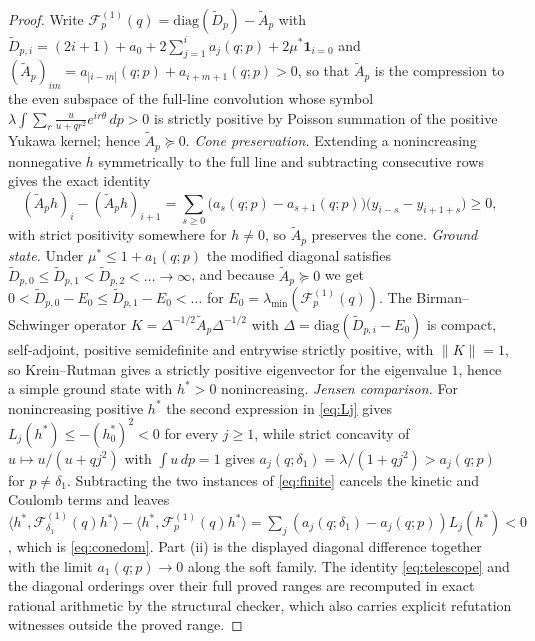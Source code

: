\documentclass[11pt]{article}
\newcommand{\Fcal}{\mathcal F}
\newcommand{\muS}{\mu^{*}}
\theoremstyle{definition}
\theoremstyle{remark}
\begin{document}
\begin{proof}
Write $\Fcal_p^{(1)}(q)=\mathrm{diag}(\tilde D_p)-\tilde A_p$ with
$\tilde D_{p,i}=(2i+1)+a_0+2\sum_{j=1}^i a_j(q;p)+2\muS\mathbf 1_{i=0}$ and
$(\tilde A_p)_{im}=a_{|i-m|}(q;p)+a_{i+m+1}(q;p)>0$, so that $\tilde A_p$ is the
compression to the even subspace of the full-line convolution whose symbol
$\lambda\int\sum_r\frac{u}{u+qr^2}e^{ir\theta}\,dp>0$ is strictly positive by Poisson
summation of the positive Yukawa kernel; hence $\tilde A_p\succeq0$.
\emph{Cone preservation.} Extending a nonincreasing nonnegative $h$ symmetrically to the
full line and subtracting consecutive rows gives the exact identity
\begin{equation}\label{eq:telescope}
(\tilde A_ph)_i-(\tilde A_ph)_{i+1}
=\sum_{s\ge0}\big(a_s(q;p)-a_{s+1}(q;p)\big)\big(y_{i-s}-y_{i+1+s}\big)\ge0,
\end{equation}
with strict positivity somewhere for $h\ne0$, so $\tilde A_p$ preserves the cone.
\emph{Ground state.} Under $\muS\le1+a_1(q;p)$ the modified diagonal satisfies
$\tilde D_{p,0}\le\tilde D_{p,1}<\tilde D_{p,2}<\dots\to\infty$, and because
$\tilde A_p\succeq0$ we get $0<\tilde D_{p,0}-E_0\le\tilde D_{p,1}-E_0<\dots$ for
$E_0=\lambda_{\min}(\Fcal_p^{(1)}(q))$. The Birman--Schwinger operator
$K=\Delta^{-1/2}\tilde A_p\Delta^{-1/2}$ with $\Delta=\mathrm{diag}(\tilde D_{p,i}-E_0)$
is compact, self-adjoint, positive semidefinite and entrywise strictly positive, with
$\|K\|=1$, so Krein--Rutman gives a strictly positive eigenvector for the eigenvalue $1$,
hence a simple ground state with $h^*>0$ nonincreasing.
\emph{Jensen comparison.} For nonincreasing positive $h^*$ the second expression in
\eqref{eq:Lj} gives $L_j(h^*)\le-(h^*_0)^2<0$ for every $j\ge1$, while strict concavity of
$u\mapsto u/(u+qj^2)$ with $\int u\,dp=1$ gives
$a_j(q;\delta_1)=\lambda/(1+qj^2)>a_j(q;p)$ for $p\ne\delta_1$. Subtracting the two
instances of \eqref{eq:finite} cancels the kinetic and Coulomb terms and leaves
$\langle h^*,\Fcal_{\delta_1}^{(1)}(q)h^*\rangle
-\langle h^*,\Fcal_p^{(1)}(q)h^*\rangle
=\sum_j(a_j(q;\delta_1)-a_j(q;p))L_j(h^*)<0$, which is \eqref{eq:conedom}. Part (ii) is
the displayed diagonal difference together with the limit $a_1(q;p)\to0$ along the soft
family. The identity \eqref{eq:telescope} and the diagonal orderings over their full
proved ranges are recomputed in exact rational arithmetic by the structural checker, which
also carries explicit refutation witnesses outside the proved range.
\end{proof}
\end{document}
